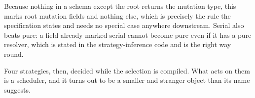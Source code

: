 Because nothing in a schema except the root returns the mutation type, this
marks root mutation fields and nothing else, which is precisely the rule the
specification states and needs no special case anywhere downstream. Serial also
beats pure: a field already marked serial cannot become pure even if it has a
pure resolver, which is stated in the strategy-inference code and is the right
way round.

\medskip
Four strategies, then, decided while the selection is compiled. What acts on
them is a scheduler, and it turns out to be a smaller and stranger object than
its name suggests.

%
